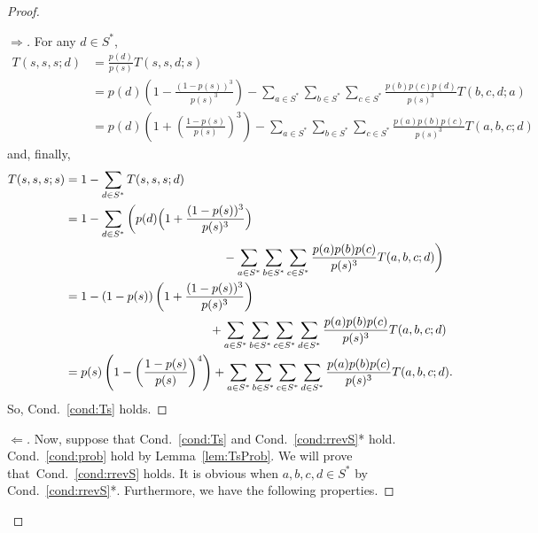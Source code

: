 \documentclass[AHL,Unicode,longabstracts]{cedram}
\newcounter{a}
\newcommand{\Cond}{Cond.}
\begin{document}
\begin{proof}
\begin{proof}[$\Rightarrow$]
For any $d \in S^*$,
\begin{align*}
T(s,s,s;d) & = \frac{p(d)}{p(s)} T(s,s,d;s) \\
& = p(d) \left(1 - \frac{(1-p(s))^3}{p(s)^3} \right) - \sum_{a \in S^*} \sum_{b \in S^*} \sum_{c \in S^*} \frac{p(b)p(c)p(d)}{p(s)^3}T(b,c,d;a)\\
& = p(d) \left(1 + \left(\frac{1-p(s)}{p(s)} \right)^3\right) - \sum_{a \in S^*} \sum_{b \in S^*} \sum_{c \in S^*} \frac{p(a)p(b)p(c)}{p(s)^3}T(a,b,c;d)
\end{align*}
and, finally,
\begingroup
\allowdisplaybreaks
\begin{align*}
T(s,s,s;s) & = 1 - \sum_{d \in S^*} T(s,s,s;d) \\*
& = 1 - \sum_{d \in S^*} \bigg(p(d) \Big(1 + \frac{(1-p(s))^3}{p(s)^3} \Big)\\*
&\mkern 235mu - \sum_{a \in S^*} \sum_{b \in S^*} \sum_{c \in S^*} \frac{p(a)p(b)p(c)}{p(s)^3}T(a,b,c;d) \bigg)\\
& = 1 - (1-p(s)) \left(1 + \frac{(1-p(s))^3}{p(s)^3} \right)\\*
&\mkern 215mu+ \sum_{a \in S^*} \sum_{b \in S^*} \sum_{c \in S^*} \sum_{d \in S^*} \frac{p(a)p(b)p(c)}{p(s)^3}T(a,b,c;d) \\
& = p(s) \left(1 - \left(\frac{1-p(s)}{p(s)} \right)^4 \right) + \sum_{a \in S^*} \sum_{b \in S^*} \sum_{c \in S^*} \sum_{d \in S^*} \frac{p(a)p(b)p(c)}{p(s)^3}T(a,b,c;d).
\end{align*}
\endgroup
So, \Cond~\ref{cond:Ts} holds.
\let\qed\relax
\end{proof}

\begin{proof}[$\Leftarrow$]
Now, suppose that \Cond~\ref{cond:Ts} and \Cond~\ref{cond:rrevS}* hold. \Cond~\ref{cond:prob} hold by Lemma~\ref{lem:TsProb}. We will prove that~\Cond~\ref{cond:rrevS} holds. It is obvious when $a,b,c,d \in S^*$ by \Cond~\ref{cond:rrevS}*. Furthermore, we have the following properties.


\end{proof}
\end{proof}
\end{document}

